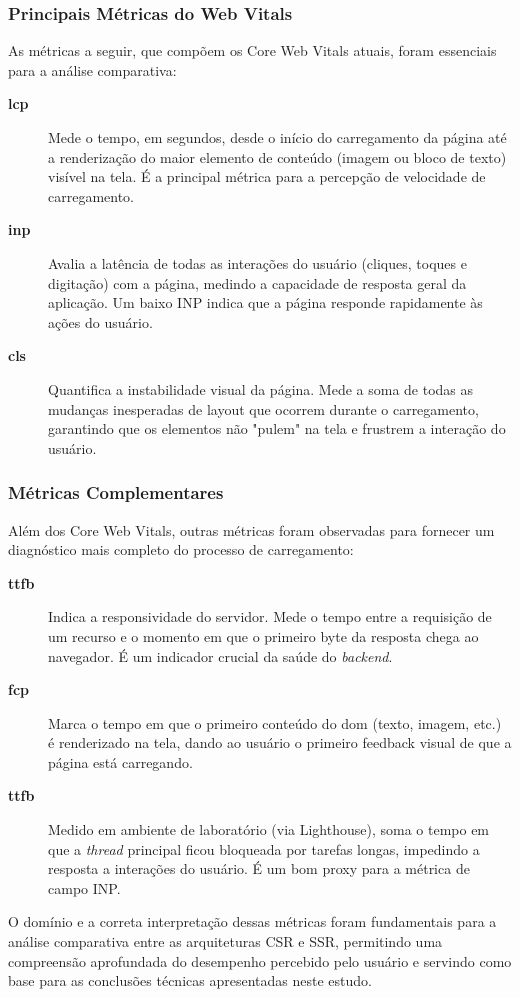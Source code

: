 \subsubsection{Principais Métricas do Web Vitals}
As métricas a seguir, que compõem os Core Web Vitals atuais, foram essenciais para a análise comparativa:
\begin{description}
    \item[\textbf{\acrfull{lcp}}] Mede o tempo, em segundos, desde o início do carregamento da página até a renderização do maior elemento de conteúdo (imagem ou bloco de texto) visível na tela. É a principal métrica para a percepção de velocidade de carregamento.
    \item[\textbf{\acrfull{inp}}] Avalia a latência de todas as interações do usuário (cliques, toques e digitação) com a página, medindo a capacidade de resposta geral da aplicação. Um baixo INP indica que a página responde rapidamente às ações do usuário.
    \item[\textbf{\acrfull{cls}}] Quantifica a instabilidade visual da página. Mede a soma de todas as mudanças inesperadas de layout que ocorrem durante o carregamento, garantindo que os elementos não "pulem" na tela e frustrem a interação do usuário.
\end{description}

\subsubsection{Métricas Complementares}
Além dos Core Web Vitals, outras métricas foram observadas para fornecer um diagnóstico mais completo do processo de carregamento:
\begin{description}
    \item[\textbf{\acrfull{ttfb}}] Indica a responsividade do servidor. Mede o tempo entre a requisição de um recurso e o momento em que o primeiro byte da resposta chega ao navegador. É um indicador crucial da saúde do \textit{backend}.
    \item[\textbf{\acrfull{fcp}}] Marca o tempo em que o primeiro conteúdo do \acrshort{dom} (texto, imagem, etc.) é renderizado na tela, dando ao usuário o primeiro feedback visual de que a página está carregando.
    \item[\textbf{\acrfull{ttfb}}] Medido em ambiente de laboratório (via Lighthouse), soma o tempo em que a \textit{thread} principal ficou bloqueada por tarefas longas, impedindo a resposta a interações do usuário. É um bom proxy para a métrica de campo INP.
\end{description}
O domínio e a correta interpretação dessas métricas foram fundamentais para a análise comparativa entre as arquiteturas CSR e SSR, permitindo uma compreensão aprofundada do desempenho percebido pelo usuário e servindo como base para as conclusões técnicas apresentadas neste estudo.

